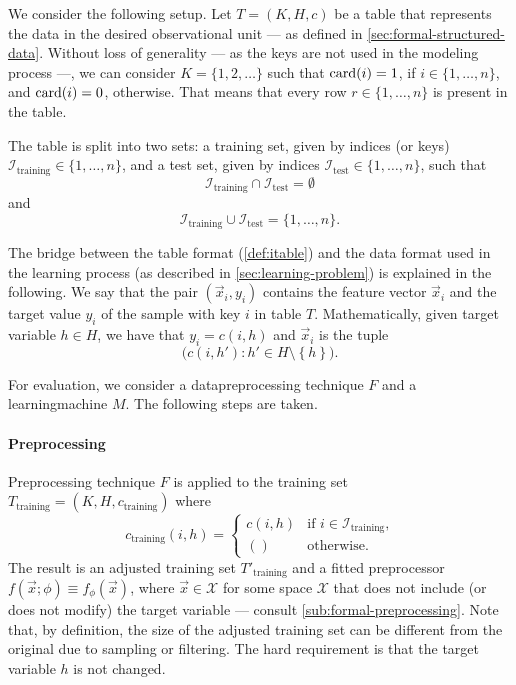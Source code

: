 We consider the following setup.  Let $T = (K, H, c)$ be a table that represents the data
in the desired observational unit --- as defined in \cref{sec:formal-structured-data}.
Without loss of generality --- as the keys are not used in the modeling process ---, we
can consider $K = \{1, 2, \dots\}$ such that $\rowcard[i] = 1$, if $i \in \{1, \dots,
n\}$, and $\rowcard[i] = 0$, otherwise.  That means that every row $r \in \{1, \dots, n\}$
is present in the table.

The table is split into two sets: a training set, given by indices (or keys)
$\mathcal{I}_\text{training} \in \{1, \dots, n\}$, and a test set, given by indices
$\mathcal{I}_\text{test} \in \{1, \dots, n\}$, such that $$\mathcal{I}_\text{training}
\cap \mathcal{I}_\text{test} = \emptyset$$ and $$\mathcal{I}_\text{training} \cup
\mathcal{I}_\text{test} = \{1,\dots,n\}\text{.}$$

The bridge between the table format (\cref{def:itable}) and the data format used in the
learning process (as described in \cref{sec:learning-problem}) is explained in the
following.  We say that the pair $(\vec{x}_i, y_i)$ contains the feature vector $\vec{x}_i$
and the target value $y_i$ of the sample with key $i$ in table $T$.  Mathematically,
given target variable $h \in H$, we have that $y_i = c(i, h)$ and $\vec{x}_i$ is the tuple
$$\big(c(i, h') : h' \in H \setminus \left\{ h \right\}\big)\text{.}$$

For evaluation, we consider a \gls{datapreprocessing} technique $F$ and a \gls{learningmachine}
$M$.  The following steps are taken.

\paragraph{Preprocessing}

Preprocessing technique $F$ is applied to the training set $T_\text{training} = (K, H,
c_\text{training})$ where \[
  c_\text{training}(i, h) = \begin{cases}
    c(i, h) & \text{if } i \in \mathcal{I}_\text{training}\text{,} \\
    () & \text{otherwise}\text{.}
  \end{cases}
\]  The result is an adjusted training set $T'_\text{training}$ and a fitted
\gls{preprocessor} $f(\vec{x}; \phi) \equiv f_\phi(\vec{x})$, where $\vec{x} \in \mathcal{X}$
for some space $\mathcal{X}$ that does not include (or does not modify) the target
variable --- consult \cref{sub:formal-preprocessing}.  Note that, by definition, the size
of the adjusted training set can be different from the original due to sampling or
filtering.  The hard requirement is that the target variable $h$ is not changed.

